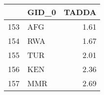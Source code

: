 \begin{tabular}{llr}
\toprule
{} & GID\_0 &  TADDA \\
\midrule
153 &   AFG &   1.61 \\
154 &   RWA &   1.67 \\
155 &   TUR &   2.01 \\
156 &   KEN &   2.36 \\
157 &   MMR &   2.69 \\
\bottomrule
\end{tabular}
